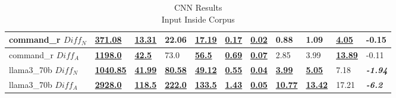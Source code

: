 \documentclass[11pt]{article}
\begin{document}
\begin{table}[ht]
{\begin{tabular}{lllllllllll}
            command\_r $Diff_N$  & \textbf{\underline{371.08}}  & \textbf{\underline{13.31}}  & 22.06                       & \textbf{\underline{17.19}} & \textbf{\underline{0.17}} & \textbf{\underline{0.02}} & 0.88                       & 1.09                       & \textbf{\underline{4.05}}  & -0.15                   \\ \midrule
            command\_r $Diff_A$  & \textbf{\underline{1198.0}}  & \textbf{\underline{42.5}}   & 73.0                        & \textbf{\underline{56.5}}  & \textbf{\underline{0.69}} & \textbf{\underline{0.07}} & 2.85                       & 3.99                       & \textbf{\underline{13.89}} & -0.11                   \\ \midrule
            llama3\_70b $Diff_N$ & \textbf{\underline{1040.85}} & \textbf{\underline{41.99}}  & \textbf{\underline{80.58}}  & \textbf{\underline{49.12}} & \textbf{\underline{0.55}} & \textbf{\underline{0.04}} & \textbf{\underline{3.99}}  & \textbf{\underline{5.05}}  & 7.18                       & \textbf{\textit{-1.94}} \\ \midrule
            llama3\_70b $Diff_A$ & \textbf{\underline{2928.0}}  & \textbf{\underline{118.5}}  & \textbf{\underline{222.0}}  & \textbf{\underline{133.5}} & \textbf{\underline{1.43}} & \textbf{\underline{0.05}} & \textbf{\underline{10.77}} & \textbf{\underline{13.42}} & 17.21                      & \textbf{\textit{-6.2}}  \\ \bottomrule
        \end{tabular}%
    }
    \caption{CNN Results\\Input Inside Corpus}\label{table-prompt-2-ifd-cnn-dailymail}
\end{table}
\end{document}
